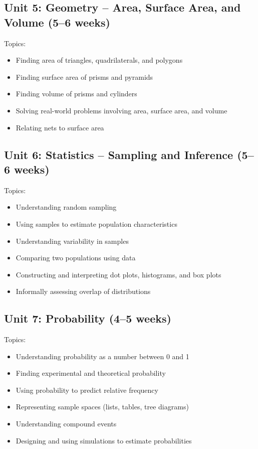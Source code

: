 \documentclass[11pt,letterpaper]{report}
\begin{document}
\subsection{Unit 5: Geometry – Area, Surface Area, and Volume (5–6 weeks)}

Topics:
\begin{itemize}
\item Finding area of triangles, quadrilaterals, and polygons
\item Finding surface area of prisms and pyramids
\item Finding volume of prisms and cylinders
\item Solving real-world problems involving area, surface area, and volume
\item Relating nets to surface area
\end{itemize}

\subsection{Unit 6: Statistics – Sampling and Inference (5–6 weeks)}

Topics:
\begin{itemize}
\item Understanding random sampling
\item Using samples to estimate population characteristics
\item Understanding variability in samples
\item Comparing two populations using data
\item Constructing and interpreting dot plots, histograms, and box plots
\item Informally assessing overlap of distributions
\end{itemize}

\subsection{Unit 7: Probability (4–5 weeks)}

Topics:
\begin{itemize}
\item Understanding probability as a number between 0 and 1
\item Finding experimental and theoretical probability
\item Using probability to predict relative frequency
\item Representing sample spaces (lists, tables, tree diagrams)
\item Understanding compound events
\item Designing and using simulations to estimate probabilities
\end{itemize}
\end{document}
